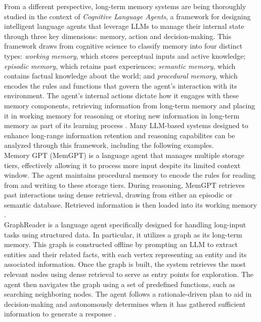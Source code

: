 \noindent From a different perspective, long-term memory systems are being thoroughly studied in the context of \textit{Cognitive Language Agents}, a framework for designing intelligent language agents that leverage LLMs to manage their internal state through three key dimensions: memory, action and decision-making. This framework draws from cognitive science to classify memory into four distinct types: \textit{working memory}, which stores perceptual inputs and active knowledge; \textit{episodic memory}, which retains past experiences; \textit{semantic memory}, which contains factual knowledge about the world; and \textit{procedural memory}, which encodes the rules and functions that govern the agent's interaction with its environment. The agent's internal actions dictate how it engages with these memory components, retrieving information from long-term memory and placing it in working memory for reasoning or storing new information in long-term memory as part of its learning process \cite{sumers2024cognitive}. Many LLM-based systems designed to enhance long-range information retention and reasoning capabilites can be analyzed through this framework, including the following examples. \\

\noindent Memory GPT (MemGPT) is a language agent that manages multiple storage tiers, effectively allowing it to process more input despite its limited context window. The agent maintains procedural memory to encode the rules for reading from and writing to these storage tiers. During reasoning, MemGPT retrieves past interactions using dense retrieval, drawing from either an episodic or semantic database. Retrieved information is then loaded into its working memory \cite{packer2024memgptllmsoperatingsystems}.\\

\noindent GraphReader is a language agent specifically designed for handling long-input tasks using structured data. In particular, it utilizes a graph as its long-term memory. This graph is constructed offline by prompting an LLM to extract entities and their related facts, with each vertex representing an entity and its associated information. Once the graph is built, the system retrieves the most relevant nodes using dense retrieval to serve as entry points for exploration. The agent then navigates the graph using a set of predefined functions, such as searching neighboring nodes. The agent follows a rationale-driven plan to aid in decision-making and autonomously determines when it has gathered sufficient information to generate a response \cite{li2024graphreaderbuildinggraphbasedagent}. \\ 

